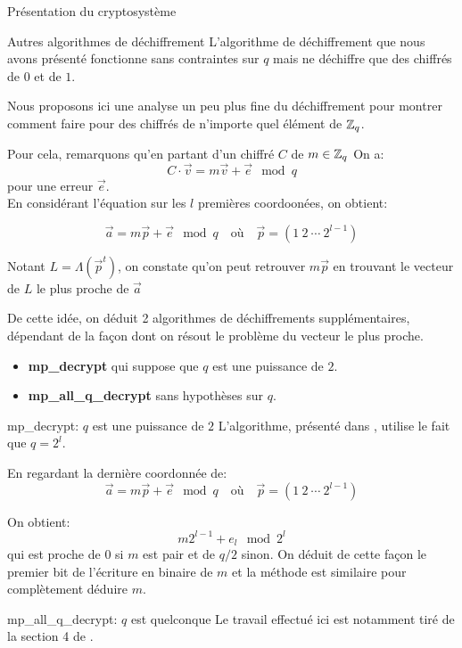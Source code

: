 \begin{section}{Présentation du cryptosystème}
\begin{subsection}{Autres algorithmes de déchiffrement}
L'algorithme de déchiffrement que nous avons présenté fonctionne sans
contraintes sur $q$ mais ne déchiffre que des chiffrés de $0$ et de $1$.
	
Nous proposons ici une analyse un peu plus fine du déchiffrement pour
montrer comment faire pour des chiffrés de n'importe quel élément de $\mathbb{Z}_q$.

Pour cela, remarquons qu'en partant d'un chiffré  $C$
de $m \in \mathbb{Z}_q$
On a: 
\[ C \cdot \vec{v} = m \vec{v} + \vec{e} \mod q \]
pour une erreur $\vec{e}$. \\
En considérant l'équation sur les $l$ premières coordoonées, on obtient:

	\[\vec{a} = m \vec{p} + \vec{e} \mod q\quad \text{où}\quad \vec{p} = (1\:2\:\cdots\:2^{l-1}) \]
 
Notant $L = \Lambda(\vec{p}^t)$, on constate qu'on peut 
retrouver $m\vec{p}$ en trouvant le vecteur de $L$
le plus proche de $\vec{a}$

De cette idée, on déduit 2 algorithmes de déchiffrements 
supplémentaires, dépendant de la façon dont 
on résout le problème du vecteur le plus proche.


\begin{itemize}
\item \textbf{mp\_decrypt} qui suppose que $q$ est 
	une puissance de $2$.
\item \textbf{mp\_all\_q\_decrypt} sans hypothèses sur $q$.
\end{itemize}

\begin{subsubsection}{mp\_decrypt: $q$ est une puissance de $2$}
L'algorithme, présenté dans  \cite{EPRINT:GenSahWat13}, utilise 
le fait que $q = 2^l$.

En regardant la dernière coordonnée de:
\[\vec{a} = m \vec{p} + \vec{e} \mod q\quad \text{où}\quad \vec{p} = (1\:2\:\cdots\:2^{l-1}) \]
 
On obtient:
\[m 2^{l-1} + e_{l} \mod 2^l \]
qui est proche de $0$ si $m$ est pair et de $q/2$ sinon. On déduit de cette 
façon le premier bit de l'écriture en binaire de $m$ et la méthode est similaire
pour complètement déduire $m$.
	
\end{subsubsection}
\begin{subsubsection}{mp\_all\_q\_decrypt: $q$ est quelconque}
Le travail effectué ici est notamment tiré de la section 4 de
\cite{EC:MicPei12}.


\end{subsubsection}
\end{subsection}
\end{section}
